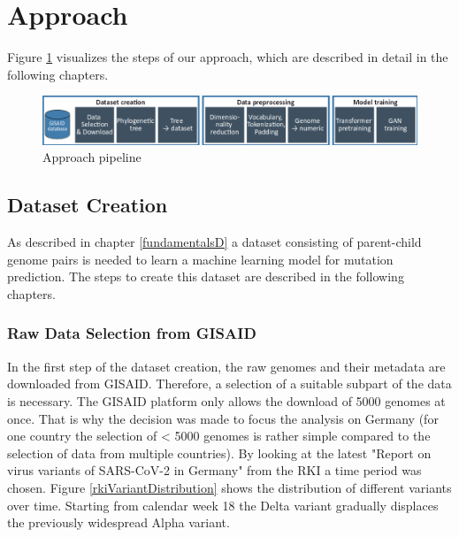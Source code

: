 \section{Approach} 
\label{approach}

Figure \ref{pipeline} visualizes the steps of our approach, which are described in detail in the following chapters.

\begin{figure}[ht]
	\centering
	\includegraphics[width=1.0\linewidth]{figures/pipeline.png}
	\caption{Approach pipeline \cite{own representation}}
	\label{pipeline}
\end{figure}


\subsection{Dataset Creation} \label{approachA}

As described in chapter \ref{fundamentalsD} a dataset consisting of parent-child genome pairs is needed to learn a machine learning model for mutation prediction. The steps to create this dataset are described in the following chapters.

\subsubsection{Raw Data Selection from \ac{GISAID}} \label{approachAa}

In the first step of the dataset creation, the raw genomes and their metadata are downloaded from \ac{GISAID}. Therefore, a selection of a suitable subpart of the data is necessary. The \ac{GISAID} platform only allows the download of 5000 genomes at once. That is why the decision was made to focus the analysis on Germany (for one country the selection of < 5000 genomes is rather simple compared to the selection of data from multiple countries). By looking at the latest "Report on virus variants of SARS-CoV-2 in Germany" from the \ac{RKI} a time period was chosen. Figure \ref{rkiVariantDistribution} shows the distribution of different variants over time. Starting from calendar week 18 the Delta variant gradually displaces the previously widespread Alpha variant.

